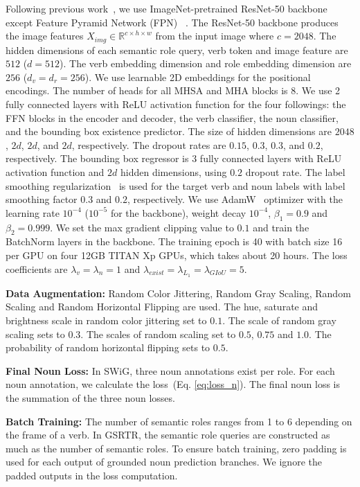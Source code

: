 Following previous work~\cite{pratt2020grounded}, we use ImageNet-pretrained ResNet-50 backbone~\cite{resnet} except Feature Pyramid Network (FPN) ~\cite{lin2017_fpn}.
The ResNet-50 backbone produces the image features $X_{img} \in \mathbb R ^ {c \times h \times w}$ from the input image where $c=2048$.
The hidden dimensions of each semantic role query, verb token and image feature are $512$ ($d=512$).
The verb embedding dimension and role embedding dimension are $256$ ($d_v=d_r=256$).
We use learnable 2D embeddings for the positional encodings.
The number of heads for all MHSA and MHA blocks is $8$.
We use 2 fully connected layers with ReLU activation function for the four followings: the FFN blocks in the encoder and decoder, the verb classifier, the noun classifier, and the bounding box existence predictor.
The size of hidden dimensions are $2048$, $2d$, $2d$, and $2d$, respectively.
The dropout rates are $0.15$, $0.3$, $0.3$, and $0.2$, respectively.
The bounding box regressor is 3 fully connected layers with ReLU activation function and $2d$ hidden dimensions, using $0.2$ dropout rate.
The label smoothing regularization~\cite{szegedy2016rethinking} is used for the target verb and noun labels with 
label smoothing factor $0.3$ and $0.2$, respectively.
We use AdamW~\cite{loshchilov2018decoupled} optimizer with the learning rate $10^{-4}$ ($10^{-5}$ for the backbone),
weight decay $10^{-4}$, $\beta_{1}=0.9$ and $\beta_{2}=0.999$.
We set the max gradient clipping value to $0.1$ and train the BatchNorm layers in the backbone.
The training epoch is 40 with batch size 16 per GPU on four 12GB TITAN Xp GPUs, which takes about 20 hours.
The loss coefficients are $\lambda_v=\lambda_n=1$ and $\lambda_{exist}=\lambda_{L_1}=\lambda_{GIoU}=5$.

\noindent\textbf{Data Augmentation:} Random Color Jittering, Random Gray Scaling, Random Scaling and Random Horizontal Flipping are used.
The hue, saturate and brightness scale in random color jittering set to $0.1$.
The scale of random gray scaling sets to $0.3$.
The scales of random scaling set to $0.5$, $0.75$ and $1.0$.
The probability of random horizontal flipping sets to $0.5$.

\noindent\textbf{Final Noun Loss:} In SWiG, three noun annotations exist per role. For each noun annotation, we calculate the loss~(Eq. \ref{eq:loss_n}). The final noun loss is the summation of the three noun losses. 

\noindent \textbf{Batch Training:} 
The number of semantic roles ranges from 1 to 6 depending on the frame of a verb.
In GSRTR, the semantic role queries are constructed as much as the number of semantic roles.
To ensure batch training, zero padding is used for each output of grounded noun prediction branches. 
We ignore the padded outputs in the loss computation.

